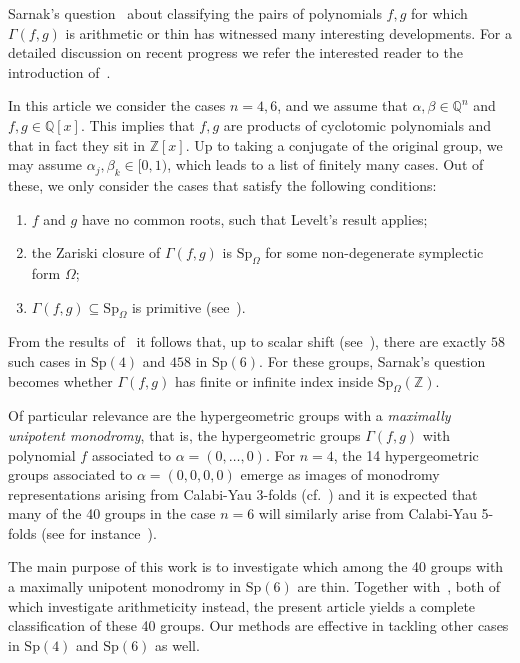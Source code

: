 \documentclass[11pt,a4paper]{amsart}
\theoremstyle{definition}
\theoremstyle{definition}
\numberwithin{equation}{section}
\newcommand{\Sp}{\mathrm{Sp}}
\begin{document}
Sarnak's question~\cite{Sa14} about classifying the pairs of polynomials $f,g$ for which $\Gamma(f,g)$ is arithmetic or thin has witnessed many interesting developments.
For a detailed discussion on recent progress we refer the interested reader to the introduction of~\cite{bdss}.

In this article we consider the cases $n=4,6$, and we assume that $\alpha,\beta\in\mathbb{Q}^{n}$ and $f,g\in\mathbb{Q}[x]$. This implies that $f,g$ are products of cyclotomic polynomials and that in fact they sit in $\mathbb{Z}[x]$. Up to taking a conjugate of the original group, we may assume $\alpha_{j},\beta_{k}\in[0,1)$, which leads to a list of finitely many cases. Out of these, we only consider the cases that satisfy the following conditions:
\begin{enumerate}
\item $f$ and $g$ have no common roots, such that Levelt's result applies;
\item the Zariski closure of $\Gamma(f,g)$ is $\mathrm{Sp}_\Omega$ for some non-degenerate symplectic form $\Omega$;
\item $\Gamma(f,g)\subseteq\mathrm{Sp}_\Omega$ is primitive (see~\cite[Def.~5.1]{BH}). 
\end{enumerate}


From the results of~\cite{BH} it follows that, up to scalar shift (see~\cite[Def.~5.5]{BH}), there are exactly $58$ such cases in $\Sp(4)$ and $458$ in $\Sp(6)$. For these groups, Sarnak's question becomes whether $\Gamma(f,g)$ has finite or infinite index inside $\mathrm{Sp}_{\Omega}(\mathbb{Z})$.


Of particular relevance are the hypergeometric groups with a \textit{maximally unipotent monodromy}, that is, the hypergeometric groups $\Gamma(f,g)$ with polynomial $f$ associated to $\alpha=\left(0,\ldots,0\right)$. For $n=4$, the 14 hypergeometric groups associated to  $\alpha=\left(0,0,0,0\right)$ emerge as images of monodromy representations arising from Calabi-Yau 3-folds (cf.~\cite[Table~1]{DM06}) and it is expected that many of the 40 groups in the case $n=6$ will similarly arise from Calabi-Yau 5-folds (see for instance~\cite{GMP,LTY}).

The main purpose of this work is to investigate which among the 40 groups with a maximally unipotent monodromy in $\Sp(6)$ are thin. Together with~\cite{bdss, BDN22}, both of which investigate arithmeticity instead, the present article yields a complete classification of these 40 groups. Our methods are effective in tackling other cases in $\Sp(4)$ and $\Sp(6)$ as well.
\end{document}
